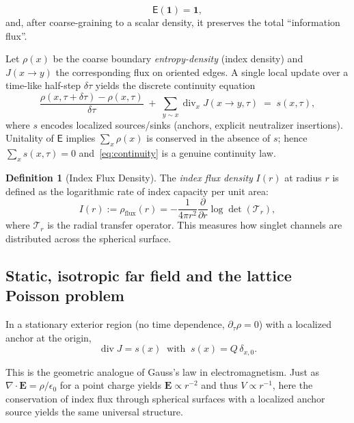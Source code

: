 \documentclass[11pt]{article}
\theoremstyle{plain}
\theoremstyle{definition}
\newtheorem{definition}[theorem]{Definition}
\begin{document}
\[
  \mathsf{E}(\mathbf{1})=\mathbf{1},
\]
and, after coarse-graining to a scalar density, it preserves the total “information flux”.

Let $\rho(x)$ be the coarse boundary \emph{entropy-density} (index density) and $J(x\!\to\!y)$ the corresponding flux on oriented edges.
A single local update over a time-like half-step $\delta \tau$ yields the discrete continuity equation
\begin{equation}\label{eq:continuity}
  \frac{\rho(x,\tau+\delta\tau)-\rho(x,\tau)}{\delta\tau}
  \;+\;\sum_{y\sim x}\! \operatorname{div}_x J(x\!\to\!y,\tau)
  \;=\; s(x,\tau),
\end{equation}
where $s$ encodes localized sources/sinks (anchors, explicit neutralizer insertions).
Unitality of $\mathsf{E}$ implies $\sum_x \rho(x)$ is conserved in the absence of $s$; hence $\sum_x s(x,\tau)=0$ and~\eqref{eq:continuity} is a genuine continuity law.

\begin{definition}[Index Flux Density]
  The \emph{index flux density} $I(r)$ at radius $r$ is defined as the logarithmic rate of index capacity per unit area:
  \[
    I(r) := \rho_{\text{flux}}(r) = -\frac{1}{4\pi r^2} \frac{\partial}{\partial r} \log \det(\mathcal{T}_r),
  \]
  where $\mathcal{T}_r$ is the radial transfer operator. This measures how singlet channels are distributed across the spherical surface.
\end{definition}

\subsection{Static, isotropic far field and the lattice Poisson problem}
In a stationary exterior region (no time dependence, \(\partial_\tau \rho=0\)) with a localized anchor at the origin,
\[
  \operatorname{div} J = s(x) \;\; \text{with} \;\; s(x)=Q\,\delta_{x,0}.
\]

This is the geometric analogue of Gauss's law in electromagnetism. Just as $\nabla \cdot \mathbf{E} = \rho/\epsilon_0$ for a point charge yields $\mathbf{E} \propto r^{-2}$ and thus $V \propto r^{-1}$, here the conservation of index flux through spherical surfaces with a localized anchor source yields the same universal structure.
\end{document}

